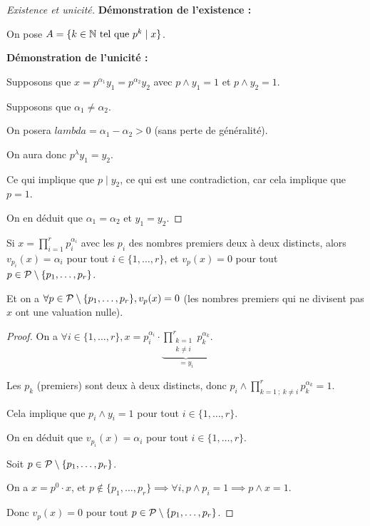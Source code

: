 \documentclass[12pt,a4paper]{report}
\begin{document}
\begin{proof}[Existence et unicité]
    \textbf{Démonstration de l'existence :}

    On pose $A = \{k \in \mathbb{N} \text{ tel que } p^k \mid x\}$.

    \textbf{Démonstration de l'unicité :}

    Supposons que $x = p^{\alpha_1}y_1 = p^{\alpha_2}y_2$ avec $p \wedge y_1 = 1$ et $p \wedge y_2 = 1$.

    Supposons que $\alpha_1 \ne \alpha_2$.

    On posera $lambda = \alpha_1 - \alpha_2 > 0$ (sans perte de généralité).

    On aura donc $p^{\lambda} y_1 = y_2$.

    Ce qui implique que $p\mid y_2$, ce qui est une contradiction, car cela implique que $p = 1$.

    On en déduit que $\alpha_1 = \alpha_2$ et $y_1 = y_2$.
    
\end{proof}

\begin{property}
    Si $x=\prod_{i=1}^r  p_i^{\alpha_i}$ avec les $p_i$ des nombres premiers deux à deux distincts, alors $v_{p_i}(x) = \alpha_i$ pour tout $i \in \{1,\dots,r\}$, et $v_p(x) = 0$ pour tout $p \in \mathcal{P}\setminus\{p_1,\dots,p_r\}$.

    Et on a $\forall p \in \mathcal{P}\setminus\{p_1,\dots,p_r\}, v_p(x) = 0$ (les nombres premiers qui ne divisent pas $x$ ont une valuation nulle).
\end{property}

\begin{proof}
    On a $\forall i \in \{1,\dots,r\}, x = p_i^{\alpha_i}\cdot \underbrace{\prod_{\substack{k=1 \\ k\ne i}}^{r}p_k^{\alpha_k}}_{=y_i}$.

    Les $p_k$ (premiers) sont deux à deux distincts, donc $p_i \wedge \prod_{k=1~;~k\ne i}^{r}p_k^{\alpha_k} = 1$.

    Cela implique que $p_i \wedge y_i = 1$ pour tout $i \in \{1,\dots,r\}$.

    On en déduit que $v_{p_i}(x) = \alpha_i$ pour tout $i \in \{1,\dots,r\}$.

    Soit $p \in \mathcal{P}\setminus\{p_1,\dots,p_r\}$.

    On a $x=p^0 \cdot x$, et $p\notin\{p_1,\dots,p_r\} \implies \forall i, p\wedge p_i = 1 \implies p \wedge x = 1$.

    Donc $v_p(x) = 0$ pour tout $p \in \mathcal{P}\setminus\{p_1,\dots,p_r\}$.
\end{proof}
\end{document}
